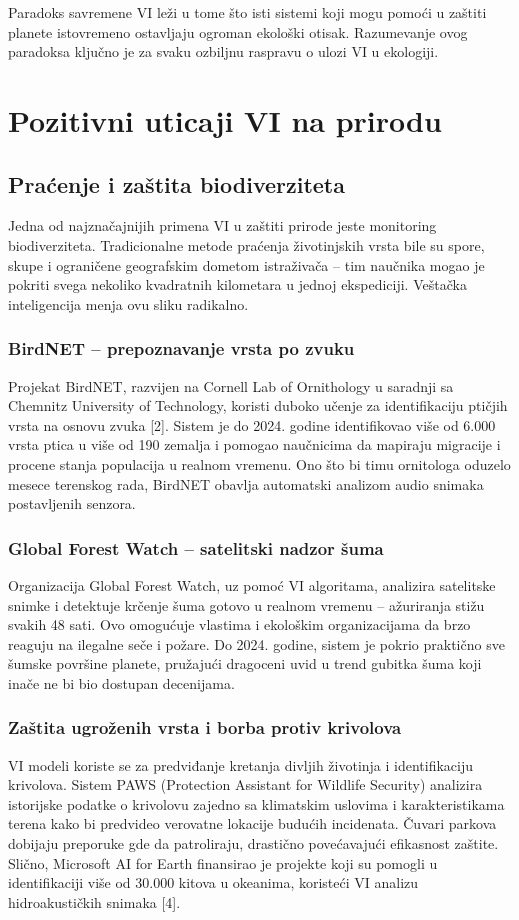 \documentclass[12pt,a4paper]{article}
\begin{document}
Paradoks savremene VI leži u tome što isti sistemi koji mogu pomoći u zaštiti planete istovremeno ostavljaju ogroman ekološki otisak. Razumevanje ovog paradoksa ključno je za svaku ozbiljnu raspravu o ulozi VI u ekologiji.

\section{Pozitivni uticaji VI na prirodu}

\subsection{Praćenje i zaštita biodiverziteta}
Jedna od najznačajnijih primena VI u zaštiti prirode jeste monitoring biodiverziteta. Tradicionalne metode praćenja životinjskih vrsta bile su spore, skupe i ograničene geografskim dometom istraživača -- tim naučnika mogao je pokriti svega nekoliko kvadratnih kilometara u jednoj ekspediciji. Veštačka inteligencija menja ovu sliku radikalno.

\subsubsection{BirdNET -- prepoznavanje vrsta po zvuku}
Projekat BirdNET, razvijen na Cornell Lab of Ornithology u saradnji sa Chemnitz University of Technology, koristi duboko učenje za identifikaciju ptičjih vrsta na osnovu zvuka [2]. Sistem je do 2024. godine identifikovao više od 6.000 vrsta ptica u više od 190 zemalja i pomogao naučnicima da mapiraju migracije i procene stanja populacija u realnom vremenu. Ono što bi timu ornitologa oduzelo mesece terenskog rada, BirdNET obavlja automatski analizom audio snimaka postavljenih senzora.

\subsubsection{Global Forest Watch -- satelitski nadzor šuma}
Organizacija Global Forest Watch, uz pomoć VI algoritama, analizira satelitske snimke i detektuje krčenje šuma gotovo u realnom vremenu -- ažuriranja stižu svakih 48 sati. Ovo omogućuje vlastima i ekološkim organizacijama da brzo reaguju na ilegalne seče i požare. Do 2024. godine, sistem je pokrio praktično sve šumske površine planete, pružajući dragoceni uvid u trend gubitka šuma koji inače ne bi bio dostupan decenijama.

\subsubsection{Zaštita ugroženih vrsta i borba protiv krivolova}
VI modeli koriste se za predviđanje kretanja divljih životinja i identifikaciju krivolova. Sistem PAWS (Protection Assistant for Wildlife Security) analizira istorijske podatke o krivolovu zajedno sa klimatskim uslovima i karakteristikama terena kako bi predvideo verovatne lokacije budućih incidenata. Čuvari parkova dobijaju preporuke gde da patroliraju, drastično povećavajući efikasnost zaštite. Slično, Microsoft AI for Earth finansirao je projekte koji su pomogli u identifikaciji više od 30.000 kitova u okeanima, koristeći VI analizu hidroakustičkih snimaka [4].
\end{document}
